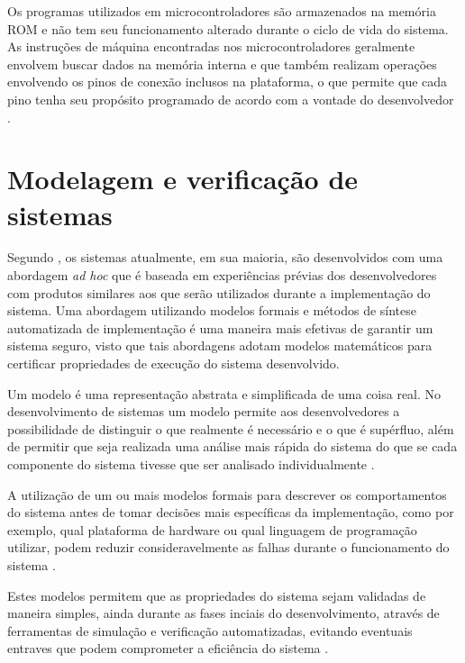 Os programas utilizados em microcontroladores são armazenados na memória ROM e não tem seu funcionamento alterado durante o ciclo de vida do sistema. As instruções de máquina encontradas nos microcontroladores geralmente envolvem buscar dados na memória interna e que também realizam operações envolvendo os pinos de conexão inclusos na plataforma, o que permite que cada pino tenha seu propósito programado de acordo com a vontade do desenvolvedor \cite{ayala:1991}.



\section{Modelagem e verificação de sistemas}

Segundo , os sistemas atualmente, em sua maioria, são desenvolvidos com uma abordagem \textit{ad hoc} que é baseada em experiências prévias dos desenvolvedores com produtos similares aos que serão utilizados durante a implementação do sistema. Uma abordagem utilizando modelos formais e métodos de síntese automatizada de implementação é uma maneira mais efetivas de garantir um sistema seguro, visto que tais abordagens adotam modelos matemáticos para certificar propriedades de execução do sistema desenvolvido. 

Um modelo é uma representação abstrata e simplificada de uma coisa real. No desenvolvimento de sistemas um modelo permite aos desenvolvedores a possibilidade de distinguir o que realmente é necessário e o que é supérfluo, além de permitir que seja realizada uma análise mais rápida do sistema do que se cada componente do sistema tivesse que ser analisado individualmente \cite{UML:2006}.

A utilização de um ou mais modelos formais para descrever os comportamentos do sistema antes de tomar decisões mais específicas da implementação, como por exemplo, qual plataforma de hardware ou qual linguagem de programação utilizar, podem reduzir consideravelmente as falhas durante o funcionamento do sistema \cite{edwards:1997}.

Estes modelos permitem que as propriedades do sistema sejam validadas de maneira simples, ainda durante as fases inciais do desenvolvimento, através de ferramentas de simulação e verificação automatizadas, evitando eventuais entraves que podem comprometer a eficiência do sistema \cite{edwards:1997}.

